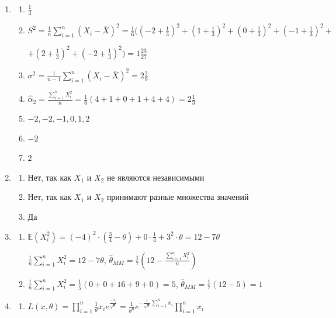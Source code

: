 \documentclass[12pt, a4paper]{article}\usepackage[]{graphicx}\usepackage[]{color}
\begin{document}
						\begin{enumerate}
							\item
							\begin{enumerate}
								\item $\frac{1}{3}$
								\item
								$S^2 = \frac{1}{n} \sum_{i=1}^n (X_i - \overline{X})^2 = \frac{1}{6} ( \left(-2 + \frac{1}{3}\right)^2 + \left(1 + \frac{1}{3} \right)^2 + \left(0 + \frac{1}{3}\right)^2 + \left(-1 + \frac{1}{3}\right)^2 + $

								$   + \left(2+ \frac{1}{3}\right)^2 + \left(-2+ \frac{1}{3}\right)^2 ) = 1\frac{23}{27}$

								\item $\sigma^2 = \frac{1}{n-1} \sum_{i=1}^n (X_i - \overline{X})^2 =2 \frac{2}{9}$
								\item $\hat{\alpha}_2 = \frac{\sum_{i=1}^n X_i^2}{n} = \frac{1}{6} (4 + 1 + 0 + 1 + 4 + 4) = 2\frac{1}{3}$
								\item $-2, -2, -1, 0, 1, 2$
								\item $-2$
								\item $2$
							\end{enumerate}

							\item
							\begin{enumerate}
								\item Нет,  так как $X_1$ и  $X_2$ не являются независимыми
								\item Нет,  так как $X_1$ и  $X_2$ принимают разные множества значений
								\item Да
							\end{enumerate}

							\item
							\begin{enumerate}
								\item $\mathbb{E}(X_i^2) = (-4)^2 \cdot \left(\frac{3}{4} - \theta\right) + 0\cdot \frac{1}{4}+ 3^2 \cdot \theta = 12 - 7\theta$

								$\frac{1}{n} \sum_{i=1}^n X_i^2 = 12 - 7\theta$, $\hat{\theta}_{MM} = \frac{1}{7} \left(12-\frac{\sum_{i=1}^n X_i^2}{n} \right)$
								\item $\frac{1}{n}\sum_{i=1}^n X_i^2 = \frac{1}{5}(0 + 0 + 16  + 9+ 0) = 5$, $\hat{\theta}_{MM} =\frac{1}{7} (12-5)= 1$
							\end{enumerate}

							\item
							\begin{enumerate}
								\item $L(x, \theta) = \prod_{i=1}^{n} \frac{1}{\theta} x_i e^{\frac{-x_i}{\sqrt{\theta}}} = \frac{1}{\theta^n} e^{-\frac{1}{\sqrt{\theta}} \sum_{i=1}^n x_i} \prod_{i=1}^{n}x_i$


\end{enumerate}
\end{enumerate}
\end{document}
